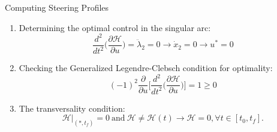\documentclass{beamer}
\newcounter{saveenumi}
\newcommand{\seti}{\setcounter{saveenumi}{\value{enumi}}}
\newcommand{\conti}{\setcounter{enumi}{\value{saveenumi}}}
\begin{document}
\begin{frame}{Computing Steering Profiles}

	\begin{block}{ }
	\begin{enumerate}
	\conti
	\item Determining the optimal control in the singular arc:
	\begin{equation}
	\frac{d^2}{dt^2}\Big(\frac{\partial \mathscr{H}}{\partial u}\Big)=\ddot{\lambda}_2=0\rightarrow \dot{x}_2=0\rightarrow u^*=0
	\end{equation}
	\item Checking the Generalized Legendre-Clebsch condition for optimality:
	\begin{equation}
	(-1)^2\frac{\partial}{\partial u}\Big[\frac{d^2}{dt^2}\Big(\frac{\partial \mathscr{H}}{\partial u}\Big)\Big]=1\geq 0
	\end{equation}
	\item The transversality condition:
	\begin{equation}
	\mathscr{H}|_{(*,t_f)}=0\  \text{and} \ \mathscr{H}\neq\mathscr{H}(t)\rightarrow \mathscr{H}=0, \forall t\in[t_0, t_f].
	\end{equation}
	\end{enumerate}
	\seti
	\end{block}
\end{frame}
\end{document}
